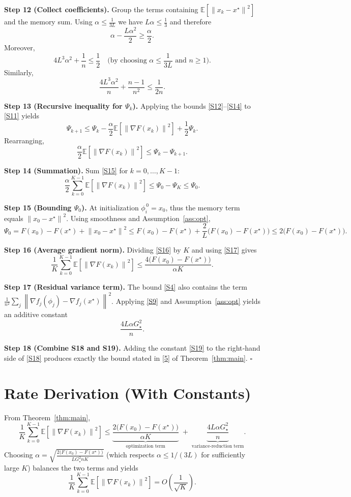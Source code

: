 \documentclass[11pt]{article}
\newcommand{\E}{\mathbb{E}}
\newcommand{\norm}[1]{\left\|#1\right\|}
\newcommand{\grad}{\nabla}
\begin{document}
\noindent\textbf{Step 12 (Collect coefficients).}  
Group the terms containing $\E[\norm{x_k-x^\star}^{2}]$ and the memory sum. Using $\alpha\le \frac{1}{3L}$ we have $L\alpha\le \frac13$ and therefore
\[
\alpha-\frac{L\alpha^{2}}{2}\ge \frac{\alpha}{2}.
\tag{S12}
\]
Moreover,
\[
4L^{3}\alpha^{2}+\frac{1}{n}\le \frac{1}{2}\quad\text{(by choosing }\alpha\le\frac{1}{3L}\text{ and }n\ge1).
\tag{S13}
\]
Similarly,
\[
\frac{4L^{3}\alpha^{2}}{n}+\frac{n-1}{n^{2}}\le\frac{1}{2n}.
\tag{S14}
\]

\noindent\textbf{Step 13 (Recursive inequality for $\Psi_k$).}  
Applying the bounds \eqref{S12}–\eqref{S14} to \eqref{S11} yields
\[
\Psi_{k+1}
\le \Psi_{k}
   -\frac{\alpha}{2}\E[\norm{\grad F(x_k)}^{2}]
   +\frac12\Psi_{k}.
\]
Rearranging,
\[
\frac{\alpha}{2}\E[\norm{\grad F(x_k)}^{2}]
\le \Psi_{k}-\Psi_{k+1}.
\tag{S15}
\]

\noindent\textbf{Step 14 (Summation).}  
Sum \eqref{S15} for $k=0,\dots ,K-1$:
\[
\frac{\alpha}{2}\sum_{k=0}^{K-1}\E[\norm{\grad F(x_k)}^{2}]
\le \Psi_{0}-\Psi_{K}
\le \Psi_{0}.
\tag{S16}
\]

\noindent\textbf{Step 15 (Bounding $\Psi_{0}$).}  
At initialization $\phi_i^{\,0}=x_0$, thus the memory term equals $\norm{x_0-x^\star}^{2}$. Using smoothness and Assumption~\ref{ass:opt},
\[
\Psi_{0}=F(x_0)-F(x^\star)+\norm{x_0-x^\star}^{2}
\le F(x_0)-F(x^\star)+\frac{2}{L}\bigl(F(x_0)-F(x^\star)\bigr)
\le 2\bigl(F(x_0)-F(x^\star)\bigr).
\tag{S17}
\]

\noindent\textbf{Step 16 (Average gradient norm).}  
Dividing \eqref{S16} by $K$ and using \eqref{S17} gives
\[
\frac{1}{K}\sum_{k=0}^{K-1}\E[\norm{\grad F(x_k)}^{2}]
\le \frac{4\bigl(F(x_0)-F(x^\star)\bigr)}{\alpha K}.
\tag{S18}
\]

\noindent\textbf{Step 17 (Residual variance term).}  
The bound \eqref{S4} also contains the term $\frac{1}{n^{2}}\sum_{j}\norm{\grad f_j(\phi_j)-\grad f_j(x^\star)}^{2}$. Applying \eqref{S9} and Assumption~\ref{ass:opt} yields an additive constant
\[
\frac{4L\alpha G_{\star}^{2}}{n}.
\tag{S19}
\]

\noindent\textbf{Step 18 (Combine S18 and S19).}  
Adding the constant \eqref{S19} to the right‑hand side of \eqref{S18} produces exactly the bound stated in \eqref{5} of Theorem~\ref{thm:main}. \hfill $\square$

\section*{Rate Derivation (With Constants)}
From Theorem~\ref{thm:main},
\[
\frac{1}{K}\sum_{k=0}^{K-1}\E[\norm{\grad F(x_k)}^{2}]
\le \underbrace{\frac{2\bigl(F(x_0)-F(x^\star)\bigr)}{\alpha K}}_{\text{optimization term}}
\;+\;
\underbrace{\frac{4L\alpha G_{\star}^{2}}{n}}_{\text{variance‑reduction term}} .
\]
Choosing $\alpha = \sqrt{\frac{2\bigl(F(x_0)-F(x^\star)\bigr)}{L G_{\star}^{2} n K}}$ (which respects $\alpha\le 1/(3L)$ for sufficiently large $K$) balances the two terms and yields
\[
\frac{1}{K}\sum_{k=0}^{K-1}\E[\norm{\grad F(x_k)}^{2}]
= O\!\left(\frac{1}{\sqrt{K}}\right).
\]
\end{document}
